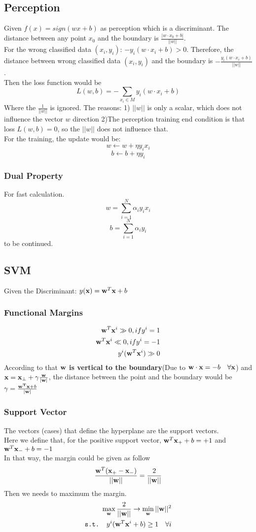 \documentclass[12pt,a4paper]{article}
\begin{document}
\subsection*{Perception}
Given $f(x)=sign(wx+b)$ as perception which is a discriminant. The distance between any point $x_0$ and the boundary is $\frac{|w\cdot x_0+b|}{||w||}$.\\
For the wrong classified data $(x_i,y_i)$: $-y_i(w\cdot x_i+b)>0$. Therefore, the distance between wrong classified data $(x_i,y_i)$ and the boundary is $-\frac{y_i(w\cdot x_i+b)}{||w||}$.\\
Then the loss function would be 
$$
L(w,b)=-\sum_{x_i\in M}y_i(w\cdot x_i+b)
$$
Where the $\frac{1}{||w||}$ is ignored. The reasons: 1) $||w||$ is only a scalar, which does not influence the vector $w$ direction 2)The perception training end condition is that loss $L(w,b)=0$, so the $||w||$ does not influence that.\\
For the training, the update would be:
$$
w\leftarrow w+\eta y_ix_i
$$$$
b\leftarrow b+\eta y_i
$$
\subsubsection*{Dual Property}
For fast calculation.
$$
w=\sum_{i=1}^{N}\alpha_iy_ix_i
$$$$
b=\sum_{i=1}^{N}\alpha_iy_i
$$
to be continued.
\subsection*{SVM}
Given the Discriminant: $y({\bf x}) = {\bf w}^T{\bf x}+b$
\subsubsection*{Functional Margins}
\begin{eqnarray*}
{\bf w}^T{\bf x}^i \gg0, if y^i = 1\\
{\bf w}^T{\bf x}^i \ll0, if y^i = -1\\
y^i({\bf w}^T{\bf x}^i) \gg 0
\end{eqnarray*}
According to that \textbf{${\bf w}$ is vertical to the boundary}(Due to ${\bf w}\cdot{\bf x}=-b \quad \forall {\bf x}$) and ${\bf x} = {\bf x}_{\perp}+\gamma\frac{\bf w}{\bf |w|}$, the distance between the point and the boundary would be $\gamma = \frac{{\bf w^T}{\bf x}+b}{|{\bf w}|}$
\subsubsection*{Support Vector}
The vectors (cases) that define the hyperplane are the support vectors.\\
Here we define that, for the positive support vector, ${\bf w}^T{\bf x}_++b=+1$ and ${\bf w}^T{\bf x}_-+b=-1$\\
In that way, the margin could be given as follow
$$
\frac{{\bf w}^T({\bf x}_+-{\bf x}_-)}{||\bf w||} = \frac{2}{||\bf w||}
$$
Then we needs to maximum the margin.
\begin{eqnarray*}
\max_{\bf w} \frac{2}{||\bf w||} \rightarrow \min_{\bf w}||{\bf w}||^2\\
\texttt{s.t. } y^i({\bf w}^T{\bf x}^i+b)\ge 1  \quad  \forall i
\end{eqnarray*}
\end{document}
